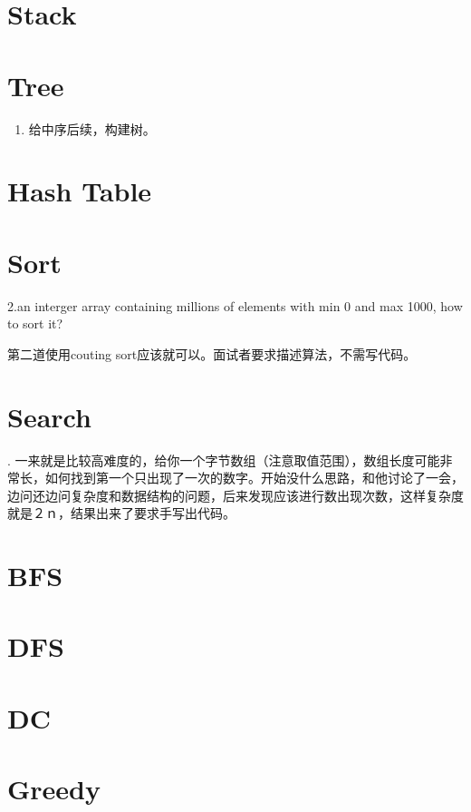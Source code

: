 \documentclass[12pt]{book}
\begin{document}
\chapter{Stack}
\label{sec-4}

\chapter{Tree}
\label{sec-5}
\begin{enumerate}
\item 给中序后续，构建树。
\end{enumerate}

\chapter{Hash Table}
\label{sec-6}

\chapter{Sort}
\label{sec-7}
2.an interger array containing millions of elements with min 0 and max 1000,
how to sort it?

第二道使用couting sort应该就可以。面试者要求描述算法，不需写代码。

\chapter{Search}
\label{sec-8}
. 一来就是比较高难度的，给你一个字节数组（注意取值范围），数组长度可能非常长，如何找到第一个只出现了一次的数字。开始没什么思路，和他讨论了一会，边问还边问复杂度和数据结构的问题，后来发现应该进行数出现次数，这样复杂度就是２ｎ，结果出来了要求手写出代码。

\chapter{BFS}
\label{sec-9}

\chapter{DFS}
\label{sec-10}

\chapter{DC}
\label{sec-11}

\chapter{Greedy}
\label{sec-12}
\end{document}
